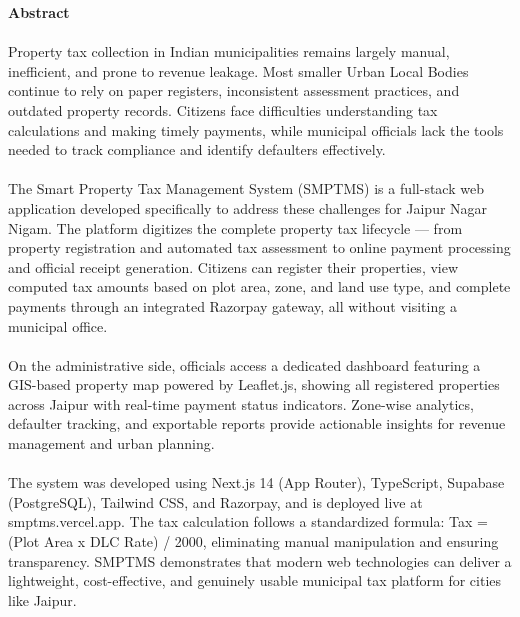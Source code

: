 \begin{center}
\thispagestyle{fancy}
\LARGE{\textbf{Abstract}}
\end{center}
\linespread{1.33}
\large{
\paragraph{}
Property tax collection in Indian municipalities remains largely manual, inefficient, and prone to revenue leakage. Most smaller Urban Local Bodies continue to rely on paper registers, inconsistent assessment practices, and outdated property records. Citizens face difficulties understanding tax calculations and making timely payments, while municipal officials lack the tools needed to track compliance and identify defaulters effectively.

\paragraph{}
The Smart Property Tax Management System (SMPTMS) is a full-stack web application developed specifically to address these challenges for Jaipur Nagar Nigam. The platform digitizes the complete property tax lifecycle — from property registration and automated tax assessment to online payment processing and official receipt generation. Citizens can register their properties, view computed tax amounts based on plot area, zone, and land use type, and complete payments through an integrated Razorpay gateway, all without visiting a municipal office.

\paragraph{}
On the administrative side, officials access a dedicated dashboard featuring a GIS-based property map powered by Leaflet.js, showing all registered properties across Jaipur with real-time payment status indicators. Zone-wise analytics, defaulter tracking, and exportable reports provide actionable insights for revenue management and urban planning.

\paragraph{}
The system was developed using Next.js 14 (App Router), TypeScript, Supabase (PostgreSQL), Tailwind CSS, and Razorpay, and is deployed live at smptms.vercel.app. The tax calculation follows a standardized formula: Tax = (Plot Area x DLC Rate) / 2000, eliminating manual manipulation and ensuring transparency. SMPTMS demonstrates that modern web technologies can deliver a lightweight, cost-effective, and genuinely usable municipal tax platform for cities like Jaipur.
}
